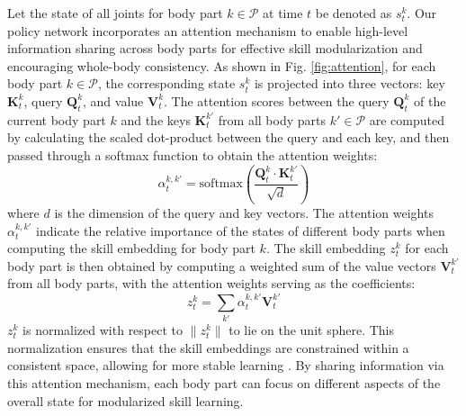 Let the state of all joints for body part $k \in \mathcal{P}$ at time $ t $ be denoted as $ s^{k}_{t} $. Our policy network incorporates an attention mechanism to enable high-level information sharing across body parts for effective skill modularization and encouraging whole-body consistency. As shown in Fig. \ref{fig:attention}, for each body part $ k \in \mathcal{P}$, the corresponding state $ s^{k}_{t} $ is projected into three vectors: key $ \mathbf{K}^{k}_{t} $, query $ \mathbf{Q}^{k}_{t} $, and value $ \mathbf{V}^{k}_{t} $. The attention scores between the query $ \mathbf{Q}^{k}_{t} $ of the current body part $k$ and the keys $ \mathbf{K}^{k'}_{t} $ from all body parts $ k' \in \mathcal{P}$ are computed by calculating the scaled dot-product between the query and each key,  and then passed through a softmax function to obtain the attention weights:
\begin{equation}
    \alpha_{t}^{k,k'} = \text{softmax}\left( \frac{\mathbf{Q}^{k}_{t} \cdot \mathbf{K}^{k'}_{t}}{\sqrt{d}} \right)
\end{equation}
where $ d $ is the dimension of the query and key vectors. The attention weights $ \alpha_{t}^{k,k'} $ indicate the relative importance of the states of different body parts when computing the skill embedding for body part $ k $.
The skill embedding $ z_{t}^{k} $ for each body part is then obtained by computing a weighted sum of the value vectors $ \mathbf{V}^{k'}_{t} $ from all body parts, with the attention weights serving as the coefficients:
\begin{equation}
    z_{t}^{k} = \sum_{k'} \alpha_{t}^{k,k'} \mathbf{V}^{k'}_{t}
\end{equation}
$ z_{t}^{k} $ is normalized with respect to $\|z_{t}^{k}\|$ to lie on the unit sphere. This normalization ensures that the skill embeddings are constrained within a consistent space, allowing for more stable learning \cite{2022-TOG-ASE}. By sharing information via this attention mechanism, each body part can focus on different aspects of the overall state for modularized skill learning.

